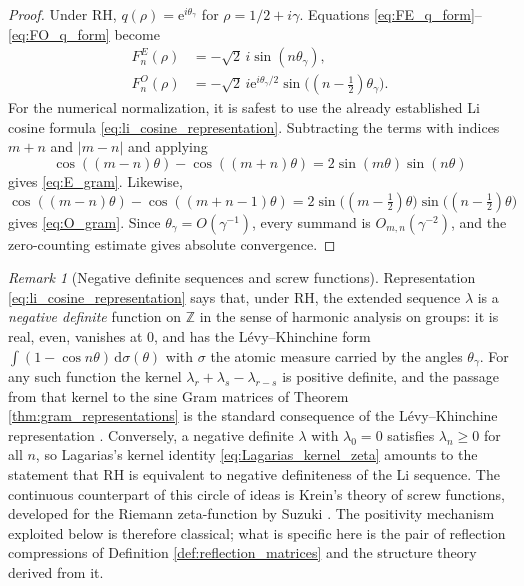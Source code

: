 \documentclass[11pt]{amsart}
\numberwithin{equation}{section}
\theoremstyle{plain}
\theoremstyle{definition}
\theoremstyle{remark}
\newtheorem{remark}[theorem]{Remark}
\newcommand{\RH}{\mathrm{RH}}
\newcommand{\e}{\mathrm e}
\newcommand{\dd}{\,\mathrm d}
\begin{document}
\begin{proof}
Under $\RH$, $q(\rho)=\e^{i\theta_\gamma}$ for $\rho=1/2+i\gamma$. Equations \eqref{eq:FE_q_form}--\eqref{eq:FO_q_form} become
\begin{align}
F_n^E(\rho)
&=-\sqrt2\,i\sin(n\theta_\gamma),
\label{eq:FE_on_zero}\\
F_n^O(\rho)
&=-\sqrt2\,i\e^{i\theta_\gamma/2}
\sin\bigl((n-\tfrac12)\theta_\gamma\bigr).
\label{eq:FO_on_zero}
\end{align}
For the numerical normalization, it is safest to use the already established Li cosine formula \eqref{eq:li_cosine_representation}. Subtracting the terms with indices $m+n$ and $|m-n|$ and applying
\begin{equation}
\cos((m-n)\theta)-\cos((m+n)\theta)
=2\sin(m\theta)\sin(n\theta)
\label{eq:integer_sine_identity}
\end{equation}
gives \eqref{eq:E_gram}. Likewise,
\begin{equation}
\cos((m-n)\theta)-\cos((m+n-1)\theta)
=2\sin\bigl((m-\tfrac12)\theta\bigr)
\sin\bigl((n-\tfrac12)\theta\bigr)
\label{eq:half_integer_sine_identity}
\end{equation}
gives \eqref{eq:O_gram}. Since $\theta_\gamma=O(\gamma^{-1})$, every summand is $O_{m,n}(\gamma^{-2})$, and the zero-counting estimate gives absolute convergence.
\end{proof}

\begin{remark}[Negative definite sequences and screw functions]
\label{rem:negative_definite_context}
Representation \eqref{eq:li_cosine_representation} says that, under $\RH$, the extended sequence $\lambda$ is a \emph{negative definite} function on $\mathbb Z$ in the sense of harmonic analysis on groups: it is real, even, vanishes at $0$, and has the L\'evy--Khinchine form $\int(1-\cos n\theta)\dd\sigma(\theta)$ with $\sigma$ the atomic measure carried by the angles $\theta_\gamma$. For any such function the kernel $\lambda_r+\lambda_s-\lambda_{r-s}$ is positive definite, and the passage from that kernel to the sine Gram matrices of Theorem \ref{thm:gram_representations} is the standard consequence of the L\'evy--Khinchine representation \cite{Schoenberg1938,BergChristensenRessel1984}. Conversely, a negative definite $\lambda$ with $\lambda_0=0$ satisfies $\lambda_n\ge0$ for all $n$, so Lagarias's kernel identity \eqref{eq:Lagarias_kernel_zeta} amounts to the statement that $\RH$ is equivalent to negative definiteness of the Li sequence. The continuous counterpart of this circle of ideas is Krein's theory of screw functions, developed for the Riemann zeta-function by Suzuki \cite{Suzuki2023Screw,SuzukiScrewLine}. The positivity mechanism exploited below is therefore classical; what is specific here is the pair of reflection compressions of Definition \ref{def:reflection_matrices} and the structure theory derived from it.
\end{remark}
\end{document}
